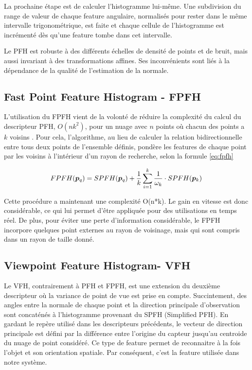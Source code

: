 La prochaine étape est de calculer l'histogramme lui-même. Une
subdivision du range de valeur de chaque feature angulaire, 
normalisés pour rester dans le même intervalle trigonométrique,
est faite et chaque cellule de l'histogramme est incrémenté dès
qu'une feature tombe dans cet intervalle. 

Le PFH est robuste à des différents échelles de densité de points et de bruit, mais aussi invariant à des transformations affines. Ses inconvénients sont liés à la dépendance de la qualité de l'estimation de la normale.

\subsection{Fast Point Feature Histogram - FPFH}

L'utilisation du FPFH vient de la volonté de réduire la complexité du
calcul du descripteur PFH, $ O(nk^2) $, pour un nuage avec $n$ points 
où chacun des points a $k$ voisins . Pour cela, l'algorithme, au
lieu de calculer la relation bidirectionnelle entre tous deux points 
de l’ensemble définis, pondère les features de chaque point  
par les voisins à l'intérieur d'un rayon de recherche, selon la formule
\ref{eq:fpfh}

\begin{equation}FPFH(\boldsymbol{p}_q) = SPFH(\boldsymbol{p}_q) + {1 \over k}
\sum_{i=1}^k {{1 \over \omega_k} \cdot SPFH(\boldsymbol{p}_k)}
\label{eq:fpfh}
\end{equation}

Cette procédure a maintenant une complexité O(n*k). Le gain en vitesse est donc considérable,
ce qui lui permet d'être appliquée pour des utilisations en temps réel. De plus, pour éviter une perte d'information considérable, le FPFH
incorpore quelques point externes au rayon de voisinage, mais qui sont compris dans un rayon de taille donné.

\subsection{Viewpoint Feature Histogram- VFH}

Le VFH, contrairement à PFH et FPFH, est une extension
du deuxième descripteur où la variance de point de vue est prise en
compte. Succintement, des angles entre la normale de chaque point
et la direction principale d'observation sont concaténés à l’histogramme
provenant du SPFH (Simplified PFH). En gardant le repère utilisé dans
les descripteurs précédents, le vecteur de direction principale est défini
par la différence entre l'origine du capteur jusqu'au centroide du
nuage de point considéré. Ce type de feature permet de reconnaitre à la fois
l'objet et son orientation spatiale. Par conséquent, c'est la
feature utilisée dans notre système.

